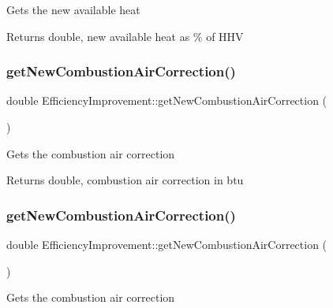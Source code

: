 Gets the new available heat

\begin{DoxyReturn}{Returns}
double, new available heat as \% of H\+HV 
\end{DoxyReturn}
\mbox{\label{class_efficiency_improvement_abcbe174b3f94a20679dff0f5bff6a330}} 
\subsubsection{\texorpdfstring{get\+New\+Combustion\+Air\+Correction()}{getNewCombustionAirCorrection()}\hspace{0.1cm}{\footnotesize\ttfamily [1/3]}}
{\footnotesize\ttfamily double Efficiency\+Improvement\+::get\+New\+Combustion\+Air\+Correction (\begin{DoxyParamCaption}{ }\end{DoxyParamCaption})}

Gets the combustion air correction

\begin{DoxyReturn}{Returns}
double, combustion air correction in btu 
\end{DoxyReturn}
\mbox{\label{class_efficiency_improvement_abcbe174b3f94a20679dff0f5bff6a330}} 
\subsubsection{\texorpdfstring{get\+New\+Combustion\+Air\+Correction()}{getNewCombustionAirCorrection()}\hspace{0.1cm}{\footnotesize\ttfamily [2/3]}}
{\footnotesize\ttfamily double Efficiency\+Improvement\+::get\+New\+Combustion\+Air\+Correction (\begin{DoxyParamCaption}{ }\end{DoxyParamCaption})}

Gets the combustion air correction

